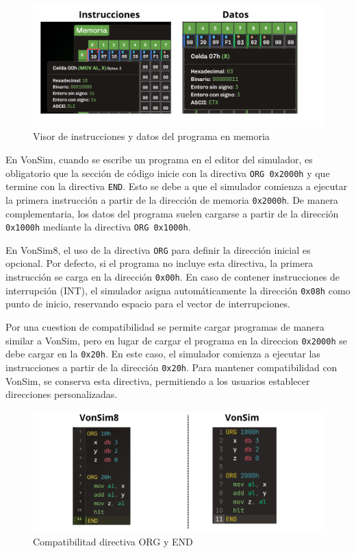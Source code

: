 \documentclass[12pt,oneside]{templates/unerthesis}
\begin{document}
\begin{figure}

{\centering \includegraphics[width=1\linewidth]{images/visorprog} 

}

\caption{Visor de instrucciones y datos del programa en memoria}\label{fig:visorprog}
\end{figure}

En VonSim, cuando se escribe un programa en el editor del simulador, es obligatorio que la sección de código inicie con la directiva \texttt{ORG\ 0x2000h} y que termine con la directiva \texttt{END}. Esto se debe a que el simulador comienza a ejecutar la primera instrucción a partir de la dirección de memoria \texttt{0x2000h}. De manera complementaria, los datos del programa suelen cargarse a partir de la dirección \texttt{0x1000h} mediante la directiva \texttt{ORG\ 0x1000h}.

En VonSim8, el uso de la directiva \texttt{ORG} para definir la dirección inicial es opcional. Por defecto, si el programa no incluye esta directiva, la primera instrucción se carga en la dirección \texttt{0x00h}. En caso de contener instrucciones de interrupción (INT), el simulador asigna automáticamente la dirección \texttt{0x08h} como punto de inicio, reservando espacio para el vector de interrupciones.

Por una cuestion de compatibilidad se permite cargar programas de manera similar a VonSim, pero en lugar de cargar el programa en la direccion \texttt{0x2000h} se debe cargar en la \texttt{0x20h}. En este caso, el simulador comienza a ejecutar las instrucciones a partir de la dirección \texttt{0x20h}. Para mantener compatibilidad con VonSim, se conserva esta directiva, permitiendo a los usuarios establecer direcciones personalizadas.

\begin{figure}

{\centering \includegraphics[width=1\linewidth]{images/org} 

}

\caption{Compatibilitad directiva ORG y END}\label{fig:org}
\end{figure}
\end{document}
